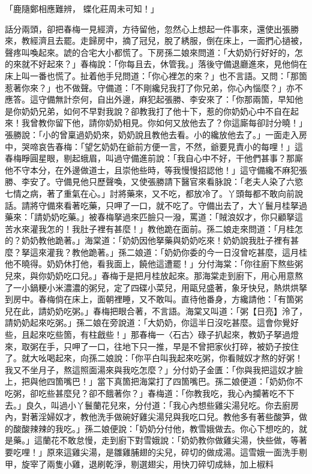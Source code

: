 \begin{showcontents}{}
「鹿隨鄭相應難辨，  蝶化莊周未可知！」

話分兩頭，卻把春梅一見經濟，方待留他，忽然心上想起一件事來，還使出張勝來，教經濟且去罷。走歸房中，摘了冠兒，脫了綉服，倒在床上，一面捫心撾被，聲疼叫喚起來。諕的合宅大小都慌了。下房孫二娘來問道：「大奶奶行好好的，怎的來就不好起來？」春梅說：「你每且去，休管我。」落後守備退廳進來，見他倘在床上叫一番也慌了。扯着他手兒問道：「你心裡怎的來？」也不言語。又問：「那箇惹著你來？」也不做聲。守備道：「不剛纔兒我打了你兄弟，你心內惱麼？」亦不應答。這守備無計奈何，自出外邊，麻犯起張勝、李安來了：「你那兩箇，早知他是你奶奶兄弟，如何不早對我說？卻教我打了他十下，惹的你奶奶心中不自在起來！我曾教你留下他，請你奶奶相見。你如何又放他去了？你這廝每卻討分曉！」張勝說：「小的曾稟過奶奶來，奶奶說且教他去看。小的纔放他去了。」一面走入房中，哭啼哀告春梅：「望乞奶奶在爺前方便一言，不然，爺要見責小的每哩！」這春梅睜圓星眼，剔起蛾眉，叫過守備進前說：「我自心中不好，干他們甚事？那廝他不守本分，在外邊做道士，且崇他些時，等我慢慢招認他！」這守備纔不麻犯張勝、李安了。守備見他只歷聲喚，又使張勝請下醫官來看脉說：「老夫人染了六慾七情之病，著了重氣在心。」討將藥來，又不吃，都放冷了。丫頭每都不敢向前說話。請將守備來看著吃藥，只呷了一口，就不吃了。守備出去了，大丫鬟月桂拏過藥來：「請奶奶吃藥。」被春梅拏過來匹臉只一潑，罵道：「賊浪奴才，你只顧拏這苦水來灌我怎的！我肚子裡有甚麼！」教他跪在面前。孫二娘走來問道：「月桂怎的？奶奶教他跪著。」海棠道：「奶奶因他拏藥與奶奶吃來！奶奶說我肚子裡有甚麼？拏這來灌我？教他跪著。」孫二娘道：「奶奶你委的今一日沒曾吃甚麼，這月桂他不曉得。奶奶休打他，看我面上，饒他這遭罷！」分付海棠：「你往廚下熬些粥兒來，與你奶奶吃口兒。」春梅于是把月桂放起來。那海棠走到廚下，用心用意熬了一小鍋粳小米濃濃的粥兒，定了四碟小菜兒，用甌兒盛著，象牙快兒，熱烘烘拏到房中。春梅倘在床上，面朝裡睡，又不敢叫。直待他番身，方纔請他：「有箇粥兒在此，請奶奶吃粥。」春梅把眼合著，不言語。海棠又叫道：「粥【日亮】泠了，請奶奶起來吃粥。」孫二娘在旁說道：「大奶奶，你這半日沒吃甚麼。這會你覺好些，且起來吃些箇，有柱戧些！」那春梅一〈石古〉碌子扒起來，教奶子拏過燈來，取粥在手，只呷了一口，往地下只一推，早是不曾把家伙打碎，被奶子按住了。就大吆喝起來，向孫二娘說：「你平白叫我起來吃粥，你看賊奴才熬的好粥！我又不坐月子，熬這照面湯來與我吃怎麼？」分付奶子金匱：「你與我把這奴才臉上，把與他四箇嘴巴！」當下真箇把海棠打了四箇嘴巴。孫二娘便道：「奶奶你不吃粥，卻吃些甚麼兒？卻不餓著你？」春梅道：「你教我吃，我心內攔著吃不下去。」良久，叫過小丫鬟蘭花兒來，分付道：「我心內想些雞尖湯兒吃。你去廚房內，對著淫婦奴才，教他洗手做碗好雞尖湯兒與我吃口兒。教他多有著些酸笋，做的酸酸辣辣的我吃。」孫二娘便說：「奶奶分付他，教雪娥做去。你心下想吃的，就是藥。」這蘭花不敢怠慢，走到廚下對雪娥說：「奶奶教你做雞尖湯，快些做，等著要吃哩！」原來這雞尖湯，是雛雞脯翅的尖兒，碎切的做成湯。這雪娥一面洗手剔甲，旋宰了兩隻小雞，退刷乾淨，剔選翅尖，用快刀碎切成絲，加上椒料 
\end{showcontents}
